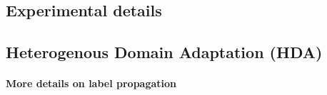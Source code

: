 


\subsection{Experimental details} \label{sec_app:exp}

\subsection{Heterogenous Domain Adaptation (HDA)}

\paragraph{More details on label propagation}

